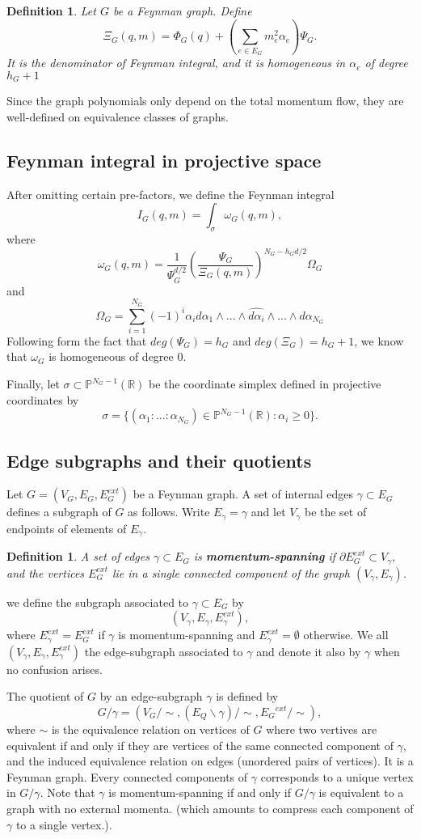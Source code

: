 \documentclass[11pt]{article}
\newtheorem{dfn}[thm]{Definition}
\newcommand{\reals}{\mathbb R}
\newcommand{\bbp}{\mathbb P}
\begin{document}
\begin{dfn}
Let $G$ be a Feynman graph. Define
$$
\Xi_G(q,m)=\Phi_G(q)+\left(\sum_{e\in E_G}m_e^2\alpha_e\right)\Psi_G.
$$
It is the denominator of Feynman integral, and it is homogeneous in $\alpha_e$ of degree $h_G+1$
\end{dfn}
Since the graph polynomials only depend on the total momentum flow, they are well-defined on equivalence classes of graphs.
\subsection{Feynman integral in projective space}
After omitting certain pre-factors, we define the Feynman integral
$$
I_G(q,m)=\int_\sigma \omega_G(q,m),
$$
where
$$
\omega_G(q,m)=\frac{1}{\Psi_G^{d/2}}\left(\frac{\Psi_G}{\Xi_G(q,m)}\right)^{N_G-h_Gd/2}\Omega_G
$$
and
$$
\Omega_G=\sum^{N_G}_{i=1}(-1)^i\alpha_i d\alpha_1\wedge...\wedge \widehat{d\alpha_i}\wedge...\wedge d\alpha_{N_G}
$$
Following form the fact that $deg(\Psi_G)=h_G$ and $deg(\Xi_G)=h_G+1$, we know that $\omega_G$ is homogeneous of degree $0$.

Finally, let $\sigma\subset \bbp^{N_G-1}(\reals)$ be the coordinate simplex defined in projective coordinates by
$$
\sigma=\{(\alpha_1:...:\alpha_{N_G})\in \bbp^{N_G-1}(\reals):\alpha_i\geq0\}.
$$
\subsection{Edge subgraphs and their quotients}

Let $G=(V_G,E_G,E_G^{ext})$ be a Feynman graph. A set of internal edges $\gamma\subset E_G$ defines a subgraph of $G$ as follows. Write $E_\gamma=\gamma$ and let $V_\gamma$ be the set of endpoints of elements of $E_\gamma$.
\begin{dfn}
A set of edges $\gamma\subset E_G$ is \textbf{momentum-spanning} if $\partial E^{ext}_G\subset V_\gamma$, and the vertices $E^{ext}_G$ lie in a single connected component of the graph $(V_\gamma, E_\gamma)$.
\end{dfn}

we define the subgraph associated to $\gamma\subset E_G$ by
$$
(V_\gamma, E_\gamma, E^{ext}_\gamma),
$$
where $E^{ext}_\gamma=E^{ext}_G$ if $\gamma$ is momentum-spanning and $E_\gamma^{ext}=\emptyset$ otherwise. We all $(V_\gamma, E_\gamma, E^{ext}_\gamma)$ the edge-subgraph associated to $\gamma$ and denote it also by $\gamma$ when no confusion arises.

The quotient of $G$ by an edge-subgraph $\gamma$ is defined by
$$
G/\gamma=(V_G/\sim,(E_Q\backslash \gamma)/\sim, {E_G}^{ext}/\sim),
$$
where $\sim$ is the equivalence relation on vertices of $G$ where two vertives are equivalent if and only if they are vertices of the same connected component of $\gamma$, and the induced equivalence relation on edges (unordered pairs of vertices). It is a Feynman graph. Every connected components of $\gamma$ corresponds to a unique vertex in $G/\gamma$. Note that $\gamma$ is momentum-spanning if and only if $G/\gamma$ is equivalent to a graph with no external momenta. (which amounts to compress each component of $\gamma$ to a single vertex.).
\end{document}
